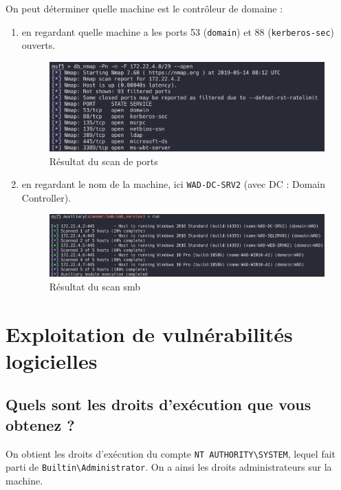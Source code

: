 \documentclass{extarticle} %
\begin{document}
    \begin{description}
        \item On peut déterminer quelle machine est le contrôleur de domaine :
    \end{description}
    \begin{enumerate}[label=>]
        \item en regardant quelle machine a les ports 53 (\texttt{domain}) et 88 (\texttt{kerberos-sec}) ouverts.
        \begin{figure}[H]
            \centering
            \includegraphics[scale=0.25]{images/port_scan.png}
            \caption{Résultat du scan de ports}
        \end{figure}
        \item en regardant le nom de la machine, ici \texttt{WAD-DC-SRV2} (avec DC : Domain Controller).
        \begin{figure}[H]
            \centering
            \includegraphics[scale=0.25]{images/smb_scan.png}
            \caption{Résultat du scan smb}
        \end{figure}
    \end{enumerate}

    \section{Exploitation de vulnérabilités logicielles}
    \subsection{Quels sont les droits d’exécution que vous obtenez ?}
    On obtient les droits d'exécution du compte \texttt{NT AUTHORITY\textbackslash SYSTEM}, lequel fait parti de \texttt{Builtin\textbackslash Administrator}.
    On a ainsi les droits administrateurs sur la machine.
\end{document}
